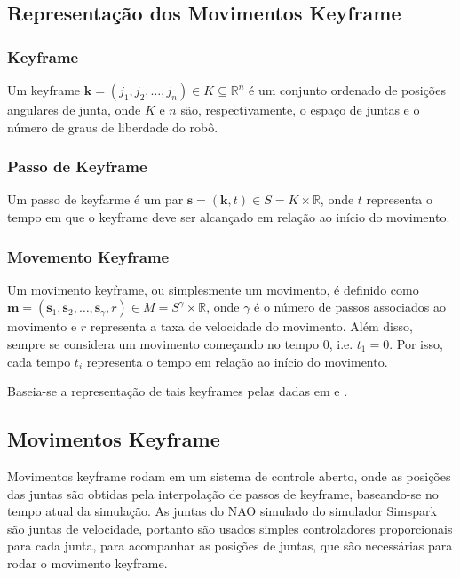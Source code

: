 \documentclass[
10pt, %
a4paper, %
oneside, %
headinclude,footinclude, %
BCOR5mm, %
]{scrartcl}
\begin{document}
\subsection{Representação dos Movimentos Keyframe}


\subsubsection{Keyframe}
Um keyframe $\mathrm{\mathbf{k}} = \left( j_{1}, j_{2}, \dots, j_{n} \right) \in K \subseteq \mathbb{R}^{n} $ é um conjunto ordenado de posições angulares de junta, onde \( K \) e \( n \) são, respectivamente, o espaço de juntas e o número de graus de liberdade do robô.

\subsubsection{Passo de Keyframe}

Um passo de keyfarme é um par $\mathrm{\mathbf{s}} = \left( \mathrm{\mathbf{k}}, t \right) \in S = K \times \mathbb{R} $, onde \( t \) representa o tempo em que o keyframe deve ser alcançado em relação ao início do movimento.


\subsubsection{Movemento Keyframe}
Um movimento keyframe, ou simplesmente um movimento, é definido como $\mathrm{\mathbf{m}} = \left( \mathrm{\mathbf{s}}_1, \mathrm{\mathbf{s}}_2, \dots, \mathrm{\mathbf{s}}_{\gamma}, r \right) \in M=S^{\gamma}\times\mathbb{R}$, onde $\gamma$ é o número de passos associados ao movimento  e \( r \) representa a taxa de velocidade do movimento. Além disso, sempre se considera um movimento começando no tempo 0, i.e. \( t_1 = 0 \). Por isso, cada tempo \( t_i \) representa o tempo em relação ao início do movimento.

Baseia-se a representação de tais keyframes pelas dadas em \cite{rei2010optimizing} e \cite{LNAI14-Depinet}.

\subsection{Movimentos Keyframe}

Movimentos keyframe rodam em um sistema de controle aberto, onde as posições das juntas são obtidas pela interpolação de passos de keyframe, baseando-se no tempo atual da simulação. As juntas do NAO simulado do simulador Simspark são juntas de velocidade, portanto são usados simples controladores proporcionais para cada junta, para acompanhar as posições de juntas, que são necessárias para rodar o movimento keyframe.
\end{document}
